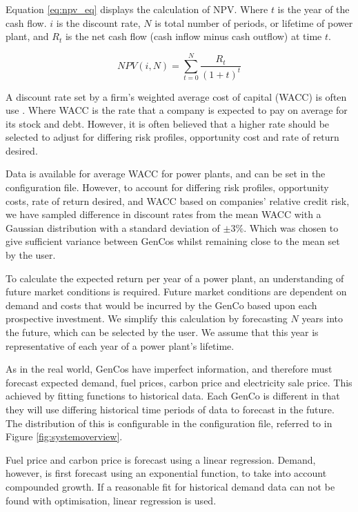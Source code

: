 Equation \ref{eq:npv_eq} displays the calculation of NPV. Where $t$ is the year of the cash flow. $i$ is the discount rate, $N$ is total number of periods, or lifetime of power plant, and $R_t$ is the net cash flow (cash inflow minus cash outflow) at time $t$.

\begin{equation} \label{eq:npv_eq}
NPV(i, N) = \sum_{t=0}^{N}\frac{R_t}{(1+t)^t}
\end{equation}

A discount rate set by a firm's weighted average cost of capital (WACC) is often use \cite{KincheloeStephenC1990TWAC}. Where WACC is the rate that a company is expected to pay on average for its stock and debt. However, it is often believed that a higher rate should be selected to adjust for differing risk profiles, opportunity cost and rate of return desired.

Data is available for average WACC for power plants, and can be set in the configuration file. However, to account for differing risk profiles, opportunity costs, rate of return desired, and WACC based on companies' relative credit risk, we have sampled difference in discount rates from the mean WACC with a Gaussian distribution with a standard deviation of $\pm3\%$. Which was chosen to give sufficient variance between GenCos whilst remaining close to the mean set by the user.

To calculate the expected return per year of a power plant, an understanding of future market conditions is required. Future market conditions are dependent on demand and costs that would be incurred by the GenCo based upon each prospective investment. We simplify this calculation by forecasting $N$ years into the future, which can be selected by the user. We assume that this year is representative of each year of a power plant's lifetime.

As in the real world, GenCos have imperfect information, and therefore must forecast expected demand, fuel prices, carbon price and electricity sale price. This achieved by fitting functions to historical data. Each GenCo is different in that they will use differing historical time periods of data to forecast in the future. The distribution of this is configurable in the configuration file, referred to in Figure \ref{fig:systemoverview}.

Fuel price and carbon price is forecast using a linear regression. Demand, however, is first forecast using an exponential function, to take into account compounded growth. If a reasonable fit for historical demand data can not be found with optimisation, linear regression is used.


